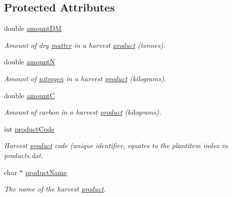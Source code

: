 \subsection*{Protected Attributes}
\begin{DoxyCompactItemize}
\item 
double \hyperlink{classharv_info_class_a1a3fe7dfd0860cdc91f818c4db6aa766}{amountDM}
\begin{DoxyCompactList}\small\item\em Amount of dry \hyperlink{classmatter}{matter} in a harvest \hyperlink{classproduct}{product} (tonnes). \item\end{DoxyCompactList}\item 
double \hyperlink{classharv_info_class_ae6e91edc30bd199357f99f0c19bd7eb8}{amountN}
\begin{DoxyCompactList}\small\item\em Amount of \hyperlink{classnitrogen}{nitrogen} in a harvest \hyperlink{classproduct}{product} (kilograms). \item\end{DoxyCompactList}\item 
double \hyperlink{classharv_info_class_ab248e1eae011902fddc10ee1645f1a75}{amountC}
\begin{DoxyCompactList}\small\item\em Amount of carbon in a harvest \hyperlink{classproduct}{product} (kilograms). \item\end{DoxyCompactList}\item 
int \hyperlink{classharv_info_class_a6018eec14905b0fc5a02ce1187f39ecc}{productCode}
\begin{DoxyCompactList}\small\item\em Harvest \hyperlink{classproduct}{product} code (unique identifier, equates to the plantitem index in products.dat. \item\end{DoxyCompactList}\item 
char $\ast$ \hyperlink{classharv_info_class_a174c8d172bdcd9b289bfa7471fef0fa3}{productName}
\begin{DoxyCompactList}\small\item\em The name of the harvest \hyperlink{classproduct}{product}. \item\end{DoxyCompactList}\end{DoxyCompactItemize}


